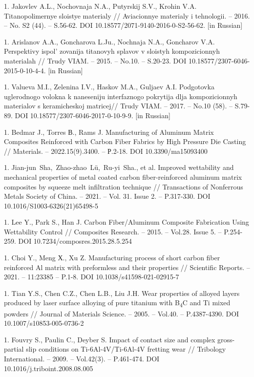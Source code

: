 1. Jakovlev A.L., Nochovnaja N.A., Putyrskij S.V., Krohin V.A.
Titanopolimernye sloistye materialy // Aviacionnye materialy i
tehnologii. -- 2016. -- No. S2 (44). -- S.56-62. DOI
10.18577/2071-9140-2016-0-S2-56-62. {[}in Russian{]}

1. Arislanov A.A., Goncharova L.Ju., Nochnaja N.A., Goncharov V.A.
Perspektivy ispol' zovanija titanovyh splavov v
sloistyh kompozicionnyh materialah // Trudy VIAM. -- 2015. -- No.10.
-- S.20-23. DOI 10.18577/2307-6046-2015-0-10-4-4. {[}in Russian{]}

1. Valueva M.I., Zelenina I.V., Haskov M.A., Guljaev A.I. Podgotovka
uglerodnogo volokna k naneseniju interfaznogo pokrytija dlja
kompozicionnyh materialov s keramicheskoj matricej// Trudy VIAM. --
2017. -- No.10 (58). -- S.79-89. DOI
10.18577/2307-6046-2017-0-10-9-9. {[}in Russian{]}

1. Bedmar J., Torres В., Rams J. Manufacturing of Aluminum Matrix
Composites Reinforced with Carbon Fiber Fabrics by High Pressure Die
Casting // Materials. -- 2022.15(9).3400. -- Р.2-18. DOI
10.3390/ma15093400

1. Jian-jun~Sha,~Zhao-zhao~Lü,~Ru-yi~Sha., et al. Improved wettability
and mechanical properties of metal coated carbon fiber-reinforced
aluminum matrix composites by squeeze melt infiltration technique //
Transactions of Nonferrous Metals Society of China. -- 2021. -- Vol.
31. Issue 2. -- P.317-330. DOI 10.1016/S1003-6326(21)65498-5

1. Lee Y., Park S., Han J. Carbon Fiber/Aluminum Composite Fabrication
Using Wettability Control // Composites Research. -- 2015. -- Vol.28.
Issue 5. -- P.254-259. DOI 10.7234/composres.2015.28.5.254

1. Choi Y., Meng Х., Xu Z. Manufacturing process of short carbon fiber
reinforced Al matrix with preformless and their properties //
Scientific Reports. -- 2021. -- 11:23385 -- P.1-8. DOI
10.1038/s41598-021-02915-7

1. Tian Y.S., Chen C.Z., Chen L.B., Liu J.H. Wear properties of alloyed
layers produced by laser surface alloying of pure titanium with
B\textsubscript{4}C and Ti mixed powders // Journal of Materials
Science. -- 2005. -- Vol.40. -- P.4387-4390. DOI
10.1007/s10853-005-0736-2

1. Fouvry S., Paulin C., Deyber S. Impact of contact size and complex
gross-partial slip conditions on Ti-6Al-4V/Ti-6Al-4V fretting wear //
Tribology International. -- 2009. -- Vol.42(3). -- P.461-474. DOI
10.1016/j.triboint.2008.08.005


